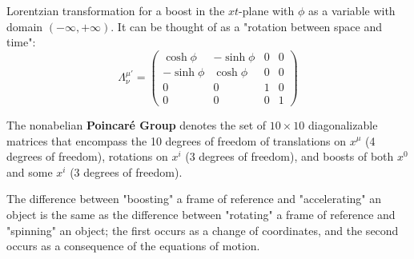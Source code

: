 \documentclass{article}
\begin{document}
 		\begin{exmp}
 			\label{ex:1.3}
 			Lorentzian transformation for a boost in the $xt$-plane with $\phi$ as a variable with domain $(-\infty, +\infty)$. It can be thought of as a "rotation between space and time":
 			$$ \Lambda_{\nu}^{\mu '} = \begin{pmatrix}
 				\cosh \phi &	-\sinh \phi	&	0	&	0	\\
 				-\sinh \phi	&	\cosh \phi &	0 	&	0 \\
 				0	&	0 	&	1	&	0\\
 				0	&	0	&	0	&	1
 			\end{pmatrix}$$
 		\end{exmp}
 		\begin{defn}
 			The nonabelian \textbf{Poincar\'{e} Group} denotes the set of $10 \times 10$ diagonalizable matrices that encompass the 10 degrees of freedom of translations on $x^\mu$ (4 degrees of freedom), rotations on $x^i$ (3 degrees of freedom), and boosts of both $x^0$ and some $x^i$ (3 degrees of freedom).
 		\end{defn}
 	\vspace{1cm}
 		\begin{note}
 			The difference between "boosting" a frame of reference and "accelerating" an object is the same as the difference between "rotating" a frame of reference and "spinning" an object; the first occurs as a change of coordinates, and the second occurs as a consequence of the equations of motion.
 		\end{note}
 	\pagebreak
\end{document}
